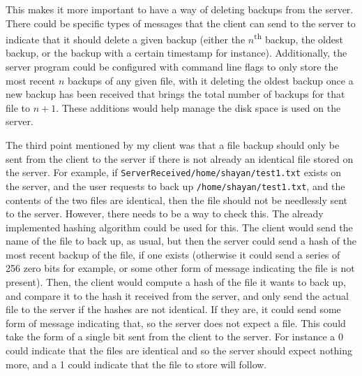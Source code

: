 \documentclass[../main.tex]{subfiles}
\begin{document}
This makes it more important to have a way of deleting backups from the server. There could be specific types of messages that the client can send to the server to indicate that it should delete a given backup (either the $n$\textsuperscript{th} backup, the oldest backup, or the backup with a certain timestamp for instance). Additionally, the server program could be configured with command line flags to only store the most recent $n$ backups of any given file, with it deleting the oldest backup once a new backup has been received that brings the total number of backups for that file to $n+1$. These additions would help manage the disk space is used on the server.

The third point mentioned by my client was that a file backup should only be sent from the client to the server if there is not already an identical file stored on the server. For example, if \texttt{ServerReceived/home/shayan/test1.txt} exists on the server, and the user requests to back up \texttt{/home/shayan/test1.txt}, and the contents of the two files are identical, then the file should not be needlessly sent to the server. However, there needs to be a way to check this. The already implemented hashing algorithm could be used for this. The client would send the name of the file to back up, as usual, but then the server could send a hash of the most recent backup of the file, if one exists (otherwise it could send a series of 256 zero bits for example, or some other form of message indicating the file is not present). Then, the client would compute a hash of the file it wants to back up, and compare it to the hash it received from the server, and only send the actual file to the server if the hashes are not identical. If they are, it could send some form of message indicating that, so the server does not expect a file. This could take the form of a single bit sent from the client to the server. For instance a 0 could indicate that the files are identical and so the server should expect nothing more, and a 1 could indicate that the file to store will follow. 
\end{document}
